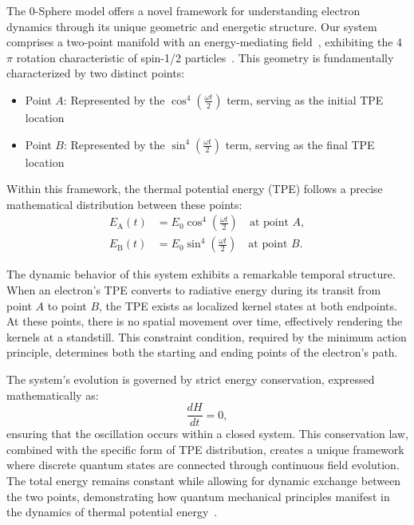 \documentclass[%
 reprint,
 amsmath,amssymb,
 aps,
]{revtex4-1}
\numberwithin{equation}{section}%
\begin{document}
The 0-Sphere model offers a novel framework for understanding electron dynamics through its unique geometric and energetic structure. Our system comprises a two-point manifold with an energy-mediating field~\cite{wilczek1984}, exhibiting the 4$\pi$ rotation characteristic of spin-1/2 particles~\cite{dirac1928}. This geometry is fundamentally characterized by two distinct points:

\begin{itemize}
    \item Point $A$: Represented by the $\cos^4(\frac{\omega t}{2})$ term, serving as the initial TPE location
    \item Point $B$: Represented by the $\sin^4(\frac{\omega t}{2})$ term, serving as the final TPE location
\end{itemize}

Within this framework, the thermal potential energy (TPE) follows a precise mathematical distribution between these points:
\begin{equation}
    \begin{split}
        E_{\mathrm{A}}(t) &= E_0\cos^4\left(\frac{\omega t}{2}\right) \quad \text{at point $A$}, \\
        E_{\mathrm{B}}(t) &= E_0\sin^4\left(\frac{\omega t}{2}\right) \quad \text{at point $B$}.
    \end{split}
    \label{eq:tpe_distribution}
\end{equation}

The dynamic behavior of this system exhibits a remarkable temporal structure. When an electron's TPE converts to radiative energy during its transit from point $A$ to point $B$, the TPE exists as localized kernel states at both endpoints. At these points, there is no spatial movement over time, effectively rendering the kernels at a standstill. This constraint condition, required by the minimum action principle, determines both the starting and ending points of the electron's path.

The system's evolution is governed by strict energy conservation, expressed mathematically as:
\begin{equation}
    \frac{dH}{dt} = 0,
    \label{eq:energy_conservation}
\end{equation}
ensuring that the oscillation occurs within a closed system. This conservation law, combined with the specific form of TPE distribution, creates a unique framework where discrete quantum states are connected through continuous field evolution. The total energy remains constant while allowing for dynamic exchange between the two points, demonstrating how quantum mechanical principles manifest in the dynamics of thermal potential energy~\cite{hanamura2023}.
\end{document}
